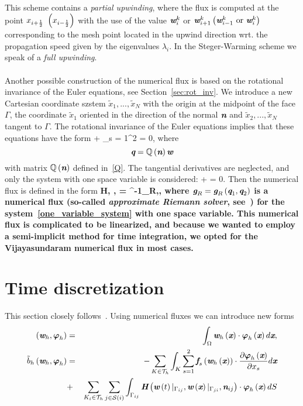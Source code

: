 This scheme contains a \emph{partial upwinding}, where the flux is computed at the point $x_{i + \frac{1}{2}}\ \lo x_{i - \frac{1}{2}}\ro$ with the use of the value $\textit{\textbf{w}}_i^k$ or $\textit{\textbf{w}}_{i+1}^k \left( \textit{\textbf{w}}_{i-1}^k \text{ or } \textit{\textbf{w}}_i^k\right)$ corresponding to the mesh point located in the upwind direction wrt. the propagation speed given by the eigenvalues $\lambda_i$. In the Steger-Warming scheme we speak of a \emph{full upwinding}.
\paragraph{}
Another possible construction of the numerical flux is based on the rotational invariance of the Euler equations, see Section~\ref{sec:rot_inv}. We introduce a new Cartesian coordinate szstem $\tilde{x}_1, ..., \tilde{x}_N$ with the origin at the midpoint of the face $\Gamma$, the coordinate $\tilde{x}_1$ oriented in the direction of the normal $\textit{\textbf{n}}$ and $\tilde{x}_2, ..., \tilde{x}_N$ tangent to $\Gamma$. The rotational invariance of the Euler equations implies that these equations have the form
\be
{} + \sum_{s = 1}^2 = 0,
\ee
where
$$
\textit{\textbf{q}} = \mathbb{Q}\left(\textit{\textbf{n}}\right)\textit{\textbf{w}}
$$
with matrix $\mathbb{Q}\left(\textit{\textbf{n}}\right)$ defined in~\eqref{Q}. The tangential derivatives are neglected, and only the system with one space variable is considered:
\be
\label{one_variable_system}
 +  = 0.
\ee
Then the numerical flux is defined in the form
\be
\bf{H}\lo{}, , \ro = ^{-1}\lo{}\ro{}_R\lo{}\lo{}\ro{},\lo{}\ro{}\ro,
\ee
where $\textit{\textbf{g}}_R = \textit{\textbf{g}}_R\left(\textit{\textbf{q}}_1, \textit{\textbf{q}}_2\right)$ is a numerical flux (so-called \emph{approximate Riemann solver}, see~\cite{feistauer}) for the system~\eqref{one_variable_system} with one space variable.
This numerical flux is complicated to be linearized, and because we wanted to employ a semi-implicit method for time integration, we opted for the Vijayasundaram numerical flux in most cases.

\section{Time discretization}
This section closely follows~\cite{DF04}. Using numerical fluxes we can introduce new forms
\begin{eqnarray}
\nonumber
\left(\textit{\textbf{w}}_h,\boldsymbol{\varphi}_h\right) & = & \int_{\Omega}\textit{\textbf{w}}_h\left(\textit{\textbf{x}}\right)\cdot\boldsymbol{\varphi}_h\left(\textit{\textbf{x}}\right) d\textit{\textbf{x}},\\
\label{tilde_b}
\tilde{b}_h\left(\textit{\textbf{w}}_h,\boldsymbol{\varphi}_h\right) & = &-\sum_{K\in\mathcal{T}_h}\int_K\sum_{s=1}^2\textit{\textbf{f}}_s\left(\textit{\textbf{w}}_h\left(\textit{\textbf{x}}\right)\right)\cdot\frac{\partial\boldsymbol{\varphi}_h\left(\textit{\textbf{x}}\right)}{\partial x_s} d\textit{\textbf{x}} \\ \nonumber
& + & \sum_{K_i\in\mathcal{T}_h}\sum_{j\in\mathcal{S}\left( i\right)} \int_{\Gamma_{ij}}\textit{\textbf{H}}\left(\textit{\textbf{w}}\left( t\right)|_{\Gamma_{ij}}, \textit{\textbf{w}}\left(\textit{\textbf{x}}\right)|_{\Gamma_{ji}},\textit{\textbf{n}}_{ij}\right)\cdot \boldsymbol{\varphi}_h\left(\textit{\textbf{x}}\right) dS
\end{eqnarray}

